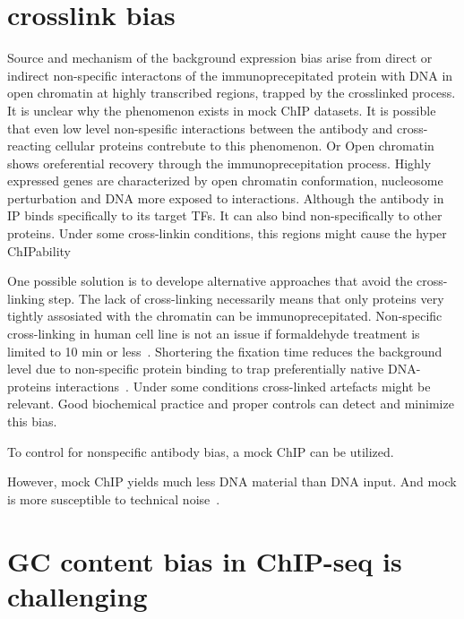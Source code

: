 \section{crosslink bias}

Source and mechanism of the background expression bias arise from direct or indirect non-specific interactons of the immunoprecepitated protein with DNA in  open chromatin at highly transcribed regions, trapped by the crosslinked process.
It is unclear why the phenomenon exists in mock ChIP datasets.
It is possible that even low level non-spesific interactions between the antibody and cross-reacting cellular proteins contrebute to this phenomenon.
Or Open chromatin shows oreferential recovery through the immunoprecepitation process.
Highly expressed genes are characterized by open chromatin conformation, nucleosome perturbation and DNA more exposed to interactions.\cite{}
Although the antibody in IP binds specifically to its target TFs.
It can also bind non-specifically to other proteins.
Under some cross-linkin conditions, this regions might cause the hyper ChIPability\cite{}

One possible solution is to develope alternative approaches that avoid the cross-linking step.
The lack of cross-linking necessarily means that only proteins very tightly assosiated with the chromatin can be immunoprecepitated.
Non-specific cross-linking in human cell line is not an issue if formaldehyde treatment is limited to 10 min or less~\cite{}.
Shortering the fixation time reduces the background level due to non-specific protein binding to trap preferentially native DNA-proteins interactions~\cite{baranello2016chip}.
Under some conditions cross-linked artefacts might be relevant.
Good biochemical practice and proper controls can detect and minimize this bias.

To control for nonspecific antibody bias, a mock ChIP can be utilized.

However, mock ChIP yields much less DNA material than DNA input.
And mock is more susceptible to technical noise~\cite{kidder2011chip, landt2012chip}.


\section{GC content bias in ChIP-seq is challenging}

